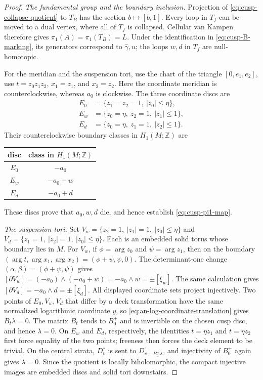 \documentclass[11pt]{article}
\theoremstyle{definition}
\theoremstyle{remark}
\numberwithin{equation}{section}
\begin{document}
\begin{proof}
\smallskip
\noindent\emph{The fundamental group and the boundary inclusion.}
Projection of \eqref{eq:cusp-collapse-quotient} to $T_B$ has the section
$b\mapsto[b,1]$.  Every loop in $T_f$ can be moved to a dual vertex,
where all of $T_f$ is collapsed.  Cellular van Kampen therefore gives
$\pi_1(A)=\pi_1(T_B)=L$.
Under the identification in \eqref{eq:cusp-B-marking}, its generators
correspond to $\widehat\gamma,u$; the loops $w,d$ in $T_f$ are
null-homotopic.

For the meridian and the suspension tori, use the chart of the
triangle $[0,e_1,e_2]$, use $t=z_0z_1z_2$, $x_1=z_1$, and
$x_2=z_2$.
Here the coordinate meridian is counterclockwise, whereas $a_0$ is
clockwise.  The three coordinate discs are
\[
 \begin{split}
 E_0&=\{z_1=z_2=1,\ |z_0|\le\eta\},\\
 E_w&=\{z_0=\eta,\ z_2=1,\ |z_1|\le1\},\\
 E_d&=\{z_0=\eta,\ z_1=1,\ |z_2|\le1\}.
 \end{split}
\]
Their counterclockwise boundary classes in $H_1(M;\mathbb Z)$ are
\begin{center}
\begin{tabular}{c@{\qquad}c}
\toprule
disc & class in $H_1(M;\mathbb Z)$\\
\midrule
$E_0$ & $-a_0$\\
$E_w$ & $-a_0+w$\\
$E_d$ & $-a_0+d$\\
\bottomrule
\end{tabular}
\end{center}
These discs prove that $a_0,w,d$ die, and hence establish
\eqref{eq:cusp-pi1-map}.

\smallskip
\noindent\emph{The suspension tori.}
Set $V_w=\{z_2=1,\ |z_1|=1,\ |z_0|\le\eta\}$ and
$V_d=\{z_1=1,\ |z_2|=1,\ |z_0|\le\eta\}$.
Each is an embedded solid torus whose boundary lies in $M$.
For $V_w$, if $\phi=\arg z_0$ and $\psi=\arg z_1$, then on the
boundary $(\arg t,\arg x_1,\arg x_2)=(\phi+\psi,\psi,0)$.
The determinant-one change $(\alpha,\beta)=(\phi+\psi,\psi)$ gives
$[\partial V_w]=(-a_0)\wedge(-a_0+w)
=-a_0\wedge w=\pm[\xi_w]$.
The same calculation gives
$[\partial V_d]=-a_0\wedge d=\pm[\xi_d]$.
All displayed coordinate sets project injectively.  Two points of
$E_0,V_w,V_d$ that differ by a deck transformation have the same normalized
logarithmic coordinate $y$, so \eqref{eq:an-log-coordinate-translation} gives
$B_t\lambda=0$.  The matrix $B_t$ tends to $B_0^+$ and is invertible on the
chosen cusp disc, and hence
$\lambda=0$.  On $E_w$ and $E_d$, respectively, the identities
$t=\eta z_1$ and $t=\eta z_2$ first force equality of the two points;
freeness then forces the deck element to be trivial.  On the central
strata, $D_v^\circ$ is sent to $D_{v+B_0^+\lambda}^\circ$, and
injectivity of $B_0^+$ again gives $\lambda=0$.  Since the quotient is
locally biholomorphic, the compact injective images are embedded discs and
solid tori downstairs.
\end{proof}
\end{document}
